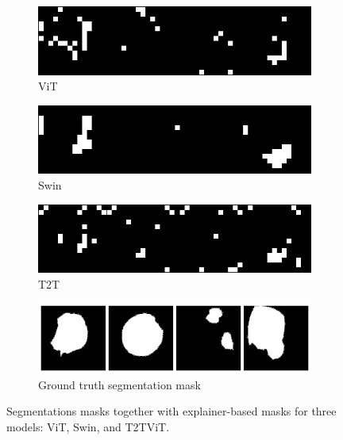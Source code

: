 \documentclass[magisterska,en]{pracamgr}
\begin{document}
\begin{figure}
\centering
\begin{subfigure}{0.55\textwidth}
   \includegraphics[width=1\linewidth]{./images/gastro_segmentation_vit_2.png}
   \caption{ViT}
\end{subfigure}
\begin{subfigure}{0.55\textwidth}
   \includegraphics[width=1\linewidth]{./images/gastro_segmentation_swin_2.png}
   \caption{Swin}
\end{subfigure}
\begin{subfigure}{0.55\textwidth}
   \includegraphics[width=1\linewidth]{./images/gastro_segmentation_t2t_vit_2.png}
   \caption{T2T}
\end{subfigure}
\begin{subfigure}{0.55\textwidth}
   \includegraphics[width=1\linewidth]{./images/gastro_segmentation_2.png}
   \caption{Ground truth segmentation mask}
\end{subfigure}
\caption{Segmentations masks together with explainer-based masks for three models: ViT, Swin, and T2T\textunderscore ViT.}
\label{segm_exp_2}
\end{figure}
\end{document}
